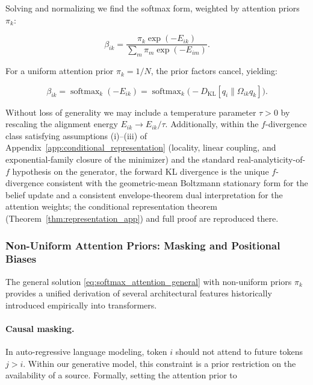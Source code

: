 \documentclass[11pt]{article}
\begin{document}
Solving and normalizing we find the softmax form, weighted by attention priors $\pi_k$:

\begin{equation}
\beta_{ik} = \frac{\pi_k \exp(-E_{ik})}{\sum_m \pi_m \exp(-E_{im})}.
\label{eq:softmax_attention_general}
\end{equation}

For a uniform attention prior $\pi_k = 1/N$, the prior factors cancel, yielding:

\begin{equation}
\boxed{\beta_{ik} = \operatorname{softmax}_k(-E_{ik}) = \operatorname{softmax}_k\big(-D_{\mathrm{KL}}[q_i \| \Omega_{ik} q_k]\big).}
\label{eq:mixture_softmax}
\end{equation}

Without loss of generality we may include a temperature parameter $\tau > 0$ by rescaling the alignment energy $E_{ik} \to E_{ik}/\tau$. Additionally, within the $f$-divergence class satisfying assumptions (i)--(iii) of Appendix~\ref{app:conditional_representation} (locality, linear coupling, and exponential-family closure of the minimizer) and the standard real-analyticity-of-$f$ hypothesis on the generator, the forward KL divergence is the unique $f$-divergence consistent with the geometric-mean Boltzmann stationary form for the belief update and a consistent envelope-theorem dual interpretation for the attention weights; the conditional representation theorem (Theorem~\ref{thm:representation_app}) and full proof are reproduced there.

\subsubsection{Non-Uniform Attention Priors: Masking and Positional Biases}
\label{sec:nonuniform_priors}

The general solution \eqref{eq:softmax_attention_general} with non-uniform priors $\pi_k$ provides a unified derivation of several architectural features historically introduced empirically into transformers.

\paragraph{Causal masking.}
In auto-regressive language modeling, token $i$ should not attend to future tokens $j > i$. Within our generative model, this constraint is a prior restriction on the availability of a source. Formally, setting the attention prior to
\end{document}
